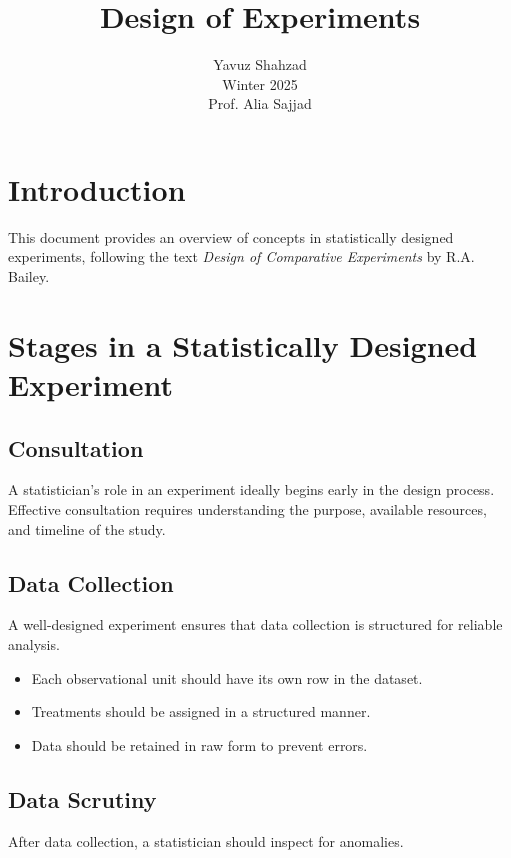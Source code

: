 \documentclass{tufte-handout}
\title{Design of Experiments}
\author[Yavuz Shahzad]{Yavuz Shahzad\\Winter 2025 \\
Prof. Alia Sajjad}
\date{}
\begin{document}
\maketitle

\tableofcontents

\section{Introduction}
This document provides an overview of concepts in statistically designed experiments, following the text \textit{Design of Comparative Experiments} by R.A. Bailey.

\section{Stages in a Statistically Designed Experiment}

\subsection{Consultation}
A statistician's role in an experiment ideally begins early in the design process. Effective consultation requires understanding the purpose, available resources, and timeline of the study.


\subsection{Data Collection}
A well-designed experiment ensures that data collection is structured for reliable analysis.

\begin{itemize}
  \item Each observational unit should have its own row in the dataset.
  \item Treatments should be assigned in a structured manner.
  \item Data should be retained in raw form to prevent errors.
\end{itemize}

\subsection{Data Scrutiny}
After data collection, a statistician should inspect for anomalies.
\end{document}
